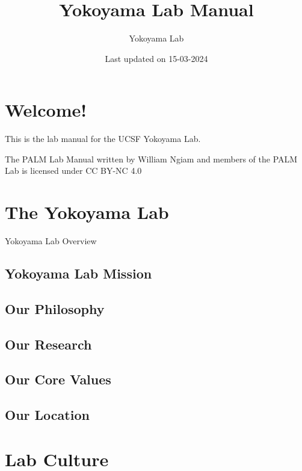 \documentclass[
]{book}
\title{Yokoyama Lab Manual}
\author{Yokoyama Lab}
\date{Last updated on 15-03-2024}
\begin{document}
\maketitle

{
\setcounter{tocdepth}{1}
\tableofcontents
}
\hypertarget{welcome}{%
\chapter*{Welcome!}\label{welcome}}

This is the lab manual for the UCSF Yokoyama Lab.

The PALM Lab Manual written by William Ngiam and members of the PALM Lab is licensed under CC BY-NC 4.0

\hypertarget{the-lab}{%
\chapter{The Yokoyama Lab}\label{the-lab}}

Yokoyama Lab Overview

\hypertarget{lab-mission}{%
\section{Yokoyama Lab Mission}\label{lab-mission}}

\hypertarget{lab-philosophy}{%
\section{Our Philosophy}\label{lab-philosophy}}

\hypertarget{our-research}{%
\section{Our Research}\label{our-research}}

\hypertarget{lab-values}{%
\section{Our Core Values}\label{lab-values}}

\hypertarget{our-location}{%
\section{Our Location}\label{our-location}}

\hypertarget{lab-culture}{%
\chapter{Lab Culture}\label{lab-culture}}
\end{document}

